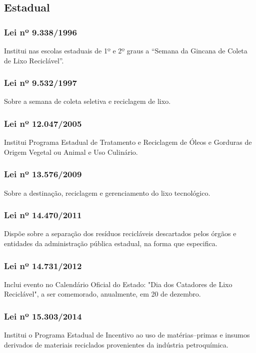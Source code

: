 \begin{subapend}
	\subsection{Estadual}
	\begin{subsubapend}
		\item \subsubsection{Lei nº 9.338/1996}
		Institui nas escolas estaduais de 1º e 2º graus a “Semana da Gincana de Coleta de Lixo Reciclável”.
		\subsubsection{Lei nº 9.532/1997}
		Sobre a semana de coleta seletiva e reciclagem de lixo.
		\subsubsection{Lei nº 12.047/2005}
		Institui Programa Estadual de Tratamento e Reciclagem de Óleos e Gorduras de Origem Vegetal ou Animal e Uso Culinário.
		\subsubsection{Lei nº 13.576/2009}
		Sobre a destinação, reciclagem e gerenciamento do lixo tecnológico.
		\subsubsection{Lei nº 14.470/2011}
		Dispõe sobre a separação dos resíduos recicláveis descartados pelos órgãos e entidades da administração pública estadual, na forma que especifica.
		\subsubsection{Lei nº 14.731/2012}
		Inclui evento no Calendário Oficial do Estado: "Dia dos Catadores de Lixo Reciclável", a ser comemorado, anualmente, em 20 de dezembro.
		\subsubsection{Lei nº 15.303/2014}
		Institui o Programa Estadual de Incentivo ao uso de matérias–primas e insumos derivados de materiais reciclados provenientes da indústria petroquímica.

\end{subsubapend}
\end{subapend}
